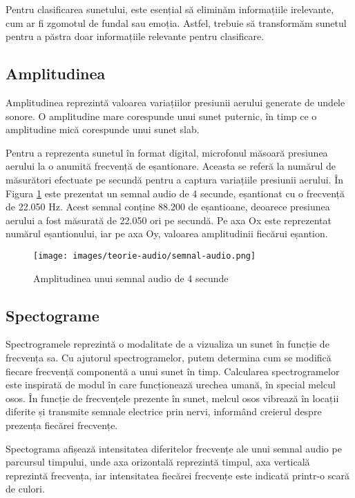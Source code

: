 Pentru clasificarea sunetului, este esențial să eliminăm informațiile irelevante, cum ar fi zgomotul de fundal sau emoția. Astfel, trebuie să transformăm sunetul pentru a păstra doar informațiile relevante pentru clasificare.


\subsection{Amplitudinea}

Amplitudinea reprezintă valoarea variațiilor presiunii aerului generate de undele sonore. O amplitudine mare corespunde unui sunet puternic, în timp ce o amplitudine mică corespunde unui sunet slab.

Pentru a reprezenta sunetul în format digital, microfonul măsoară presiunea aerului la o anumită frecvență de eșantionare. Aceasta se referă la numărul de măsurători efectuate pe secundă pentru a captura variațiile presiunii aerului. În Figura \ref{fig:amplitudineAudio} este prezentat un semnal audio de 4 secunde, eșantionat cu o frecvență de 22.050 Hz. Acest semnal conține 88.200 de eșantioane, deoarece presiunea aerului a fost măsurată de 22.050 ori pe secundă. Pe axa Ox este reprezentat numărul eșantionului, iar pe axa Oy, valoarea amplitudinii fiecărui eșantion. 

\begin{figure}
    \centering
    \texttt{[image: images/teorie-audio/semnal-audio.png]}
    \caption{Amplitudinea unui semnal audio de 4 secunde}
    \label{fig:amplitudineAudio}
\end{figure}

\subsection{Spectograme}

Spectrogramele reprezintă o modalitate de a vizualiza un sunet în funcție de frecvența sa. Cu ajutorul spectrogramelor, putem determina cum se modifică fiecare frecvență componentă a unui sunet în timp. Calcularea spectrogramelor este inspirată de modul în care funcționează urechea umană, în special melcul osos. În funcție de frecvențele prezente în sunet, melcul osos vibrează în locații diferite și transmite semnale electrice prin nervi, informând creierul despre prezența fiecărei frecvențe.

Spectograma afișează intensitatea diferitelor frecvențe ale unui semnal audio pe parcursul timpului, unde axa orizontală reprezintă timpul, axa verticală reprezintă frecvența, iar intensitatea fiecărei frecvențe este indicată printr-o scară de culori.

